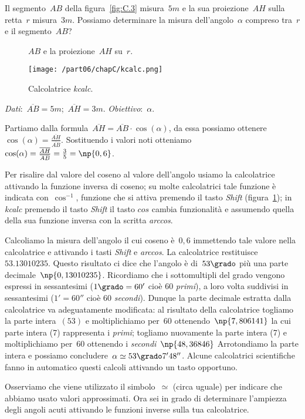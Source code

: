 \begin{problema}
Il segmento~${AB}$ della figura~\ref{fig:C.3} misura~$5\unit{m}$ e la sua proiezione~${AH}$ sulla retta~$r$ misura~$3\unit{m}$.
Possiamo determinare la misura dell'angolo~${\alpha}$ compreso tra~$r$ e il segmento~${AB}$?

\end{problema}
\begin{figure}[t]
\begin{minipage}[t]{.45\textwidth}
 \centering
 
  \caption{$AB$ e la proiezione~${AH}$ su~$r$.}\label{fig:C.3}
\end{minipage}\hfil
\begin{minipage}[t]{.45\textwidth}
 \centering
\texttt{[image: /part06/chapC/kcalc.png]}
 \caption{Calcolatrice \emph{kcalc}.}\label{fig:C.4}
\end{minipage}
\end{figure}

\emph{Dati}:~$\overline{AB}=5\unit{m}$;\quad~$\overline{AH}=3\unit{m}$. \qquad\emph{Obiettivo}:~$\alpha$.

\begin{soluzione}
 Partiamo dalla formula~$\overline{AH}=\overline{AB}\cdot \cos(\alpha)$, da essa possiamo ottenere
$\cos(\alpha)=\frac{\overline{AH}}{\overline{AB}}$. Sostituendo i valori noti otteniamo
$\cos(\alpha)=\frac{\overline{AH}}{\overline{AB}}=\frac{3}{5}=\np{0,6}$.

Per risalire dal valore del coseno al valore dell'angolo usiamo la calcolatrice attivando la funzione inversa di coseno; su molte calcolatrici
tale funzione è indicata con~$\cos^{-1}$, funzione che si attiva premendo il tasto \emph{Shift} (figura~\ref{fig:C.4}); in \emph{kcalc}
premendo il tasto \emph{Shift} il tasto $cos$ cambia funzionalità e assumendo quella della sua funzione inversa con la scritta \emph{arccos}.

Calcoliamo la misura dell'angolo il cui coseno è~$0,6$ immettendo tale valore nella calcolatrice e attivando i tasti \emph{Shift} e \emph{arccos}.
La calcolatrice restituisce~$53.13010235$.
Questo risultato ci dice che l'angolo è di~$53\grado$ più una parte decimale~$\np{0,13010235}$.
Ricordiamo che i sottomultipli del grado vengono espressi in sessantesimi ($1\grado=60'$ cioè 60 \emph{primi}),
a loro volta suddivisi in sessantesimi ($1'=60''$ cioè 60 \emph{secondi}).
Dunque la parte decimale estratta dalla calcolatrice va adeguatamente modificata:
al risultato della calcolatrice togliamo la parte intera~$(53)$ e moltiplichiamo per~$60$ ottenendo~$\np{7,806141}$ la cui parte
intera (7) rappresenta i \emph{primi}; togliamo nuovamente la parte intera (7) e moltiplichiamo per~$60$ ottenendo i \emph{secondi}~$\np{48,36846}$
Arrotondiamo la parte intera e possiamo concludere~$\alpha\simeq 53\grado 7'48''$.
Alcune calcolatrici scientifiche fanno in automatico questi calcoli attivando un tasto opportuno.

Osserviamo che viene utilizzato il simbolo~$\simeq$ (circa uguale) per indicare che abbiamo usato valori approssimati.
Ora sei in grado di determinare l'ampiezza degli angoli acuti attivando le funzioni inverse sulla tua calcolatrice.
\end{soluzione}


